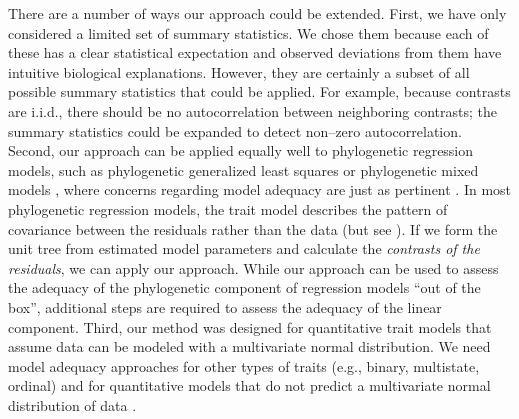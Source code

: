 \documentclass[a4paper,12pt]{article}
\begin{document}
There are a number of ways our approach could be extended. First, we have only considered a limited set of summary statistics. We chose them because each of these has a clear statistical expectation and observed deviations from them have intuitive biological explanations. However, they are certainly a subset of all possible summary statistics that could be applied. 
For example, because contrasts are i.i.d., there should be no autocorrelation between neighboring contrasts; the summary statistics could be expanded to detect non--zero autocorrelation. Second, our approach can be applied equally well to phylogenetic regression models, such as phylogenetic generalized least squares \citep{Grafen1989} or phylogenetic mixed models \citep{Lynch1991, Hadfield2010}, where concerns regarding model adequacy are just as pertinent \citep{Hansen2012}. In most phylogenetic regression models, the trait model describes the pattern of covariance between the residuals rather than the data \citep{Rohlf2001, Rohlf2006} (but see \citep{Hansen2008}). If we form the unit tree from estimated model parameters and calculate the \emph{contrasts of the residuals}, we can apply our approach. While our approach can be used to assess the adequacy of the phylogenetic component of regression models ``out of the box'', additional steps are required to assess the adequacy of the linear component. Third, our method was designed for quantitative trait models that assume data can be modeled with a multivariate normal distribution. We need model adequacy approaches for other types of traits (e.g., binary, multistate, ordinal) and for quantitative models that do not predict a multivariate normal distribution of data \citep{Landis2012}.

\end{document}
